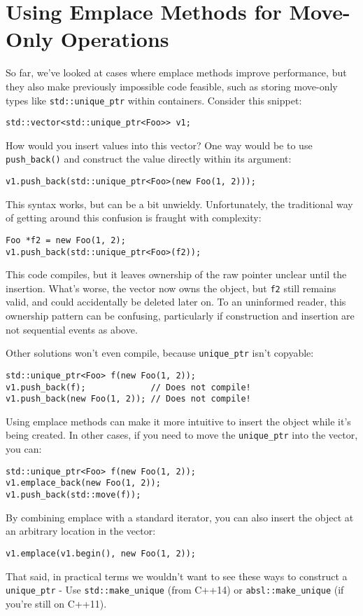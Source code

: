 \section{Using Emplace Methods for Move-Only Operations}
So far, we’ve looked at cases where emplace methods improve performance, but they also make previously impossible code feasible, such as storing move-only types like \texttt{std::unique_ptr} within containers. Consider this snippet:
\begin{verbatim}
std::vector<std::unique_ptr<Foo>> v1;
\end{verbatim}
How would you insert values into this vector? One way would be to use \texttt{push_back()} and construct the value directly within its argument:
\begin{verbatim}
v1.push_back(std::unique_ptr<Foo>(new Foo(1, 2)));
\end{verbatim}
This syntax works, but can be a bit unwieldy. Unfortunately, the traditional way of getting around this confusion is fraught with complexity:
\begin{verbatim}
Foo *f2 = new Foo(1, 2);
v1.push_back(std::unique_ptr<Foo>(f2));
\end{verbatim}
This code compiles, but it leaves ownership of the raw pointer unclear until the insertion. What’s worse, the vector now owns the object, but \texttt{f2} still remains valid, and could accidentally be deleted later on. To an uninformed reader, this ownership pattern can be confusing, particularly if construction and insertion are not sequential events as above.

Other solutions won’t even compile, because \texttt{unique_ptr} isn’t copyable:
\begin{verbatim}
std::unique_ptr<Foo> f(new Foo(1, 2));
v1.push_back(f);             // Does not compile!
v1.push_back(new Foo(1, 2)); // Does not compile!
\end{verbatim}
Using emplace methods can make it more intuitive to insert the object while it’s being created. In other cases, if you need to move the \texttt{unique_ptr} into the vector, you can:
\begin{verbatim}
std::unique_ptr<Foo> f(new Foo(1, 2));
v1.emplace_back(new Foo(1, 2));
v1.push_back(std::move(f));
\end{verbatim}
By combining emplace with a standard iterator, you can also insert the object at an arbitrary location in the vector:
\begin{verbatim}
v1.emplace(v1.begin(), new Foo(1, 2));
\end{verbatim}
That said, in practical terms we wouldn’t want to see these ways to construct a \texttt{unique_ptr} - Use \texttt{std::make_unique} (from C++14) or \texttt{absl::make_unique} (if you’re still on C++11).


